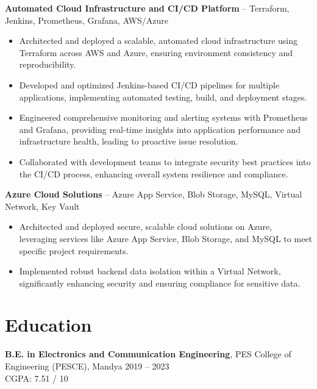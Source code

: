 \documentclass[a4paper,10pt]{article}
\begin{document}
	\textbf{Automated Cloud Infrastructure and CI/CD Platform} – Terraform, Jenkins, Prometheus, Grafana, AWS/Azure
\begin{itemize}[leftmargin=0.25in, label=\textbullet]
    \item Architected and deployed a scalable, automated cloud infrastructure using Terraform across AWS and Azure, ensuring environment consistency and reproducibility.
    \item Developed and optimized Jenkins-based CI/CD pipelines for multiple applications, implementing automated testing, build, and deployment stages.
    \item Engineered comprehensive monitoring and alerting systems with Prometheus and Grafana, providing real-time insights into application performance and infrastructure health, leading to proactive issue resolution.
    \item Collaborated with development teams to integrate security best practices into the CI/CD process, enhancing overall system resilience and compliance.
\end{itemize}


\textbf{Azure Cloud Solutions} – Azure App Service, Blob Storage, MySQL, Virtual Network, Key Vault
\begin{itemize}[leftmargin=0.25in, label=\textbullet]
    \item Architected and deployed secure, scalable cloud solutions on Azure, leveraging services like Azure App Service, Blob Storage, and MySQL to meet specific project requirements.
    \item Implemented robust backend data isolation within a Virtual Network, significantly enhancing security and ensuring compliance for sensitive data.
\end{itemize}

\section*{Education}
\textbf{B.E. in Electronics and Communication Engineering}, PES College of Engineering (PESCE), Mandya \hfill 2019 – 2023 \\CGPA: 7.51 / 10
\end{document}
